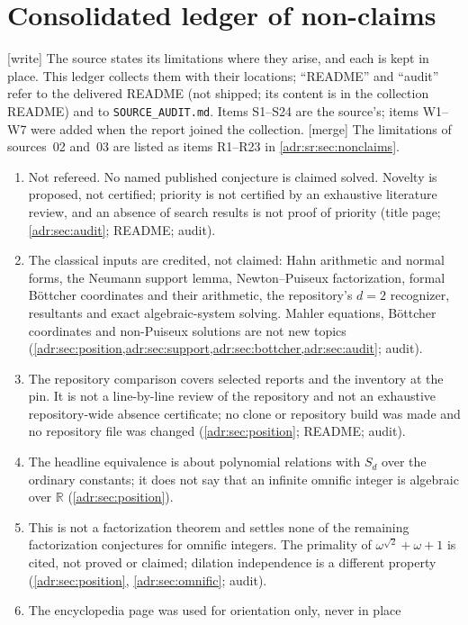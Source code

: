 \documentclass[11pt,letterpaper]{article}
\numberwithin{equation}{section}
\theoremstyle{definition}
\theoremstyle{remark}
\newcommand{\R}{\mathbb R}
\newcommand{\rpath}[1]{\nolinkurl{#1}}%
\newcommand{\wtag}{\textup{[write]}}%
\newcommand{\mtag}{\textup{[merge]}}%
\begin{document}
\section{Consolidated ledger of non-claims}\label{adr:sec:nonclaims}

\wtag{} The source states its limitations where they arise, and each is
kept in place. This ledger collects them with their locations; ``README''
and ``audit'' refer to the delivered README (not shipped; its content is in
the collection README) and to \rpath{SOURCE_AUDIT.md}. Items S1--S24 are
the source's; items W1--W7 were added when the report joined the
collection. \mtag{} The limitations of sources~02 and~03 are listed as items
R1--R23 in \cref{adr:sr:sec:nonclaims}.
\begin{enumerate}[label=S\arabic*.,leftmargin=2.6em,itemsep=2pt]
\item Not refereed. No named published conjecture is claimed solved.
Novelty is proposed, not certified; priority is not certified by an
exhaustive literature review, and an absence of search results is not
proof of priority (title page; \cref{adr:sec:audit}; README; audit).
\item The classical inputs are credited, not claimed: Hahn arithmetic and
normal forms, the Neumann support lemma, Newton--Puiseux factorization,
formal B\"ottcher coordinates and their arithmetic, the repository's
$d=2$ recognizer, resultants and exact algebraic-system solving. Mahler
equations, B\"ottcher coordinates and non-Puiseux solutions are not new
topics (\cref{adr:sec:position,adr:sec:support,adr:sec:bottcher,adr:sec:audit};
audit).
\item The repository comparison covers selected reports and the inventory
at the pin. It is not a line-by-line review of the repository and not an
exhaustive repository-wide absence certificate; no clone or repository
build was made and no repository file was changed (\cref{adr:sec:position};
README; audit).
\item The headline equivalence is about polynomial relations with $S_d$
over the ordinary constants; it does not say that an infinite omnific
integer is algebraic over $\R$ (\cref{adr:sec:position}).
\item This is not a factorization theorem and settles none of the remaining
factorization conjectures for omnific integers. The primality of
$\omega^{\sqrt2}+\omega+1$ is cited, not proved or claimed; dilation
independence is a different property (\cref{adr:sec:position},
\cref{adr:sec:omnific}; audit).
\item The encyclopedia page was used for orientation only, never in place

\end{enumerate}
\end{document}
